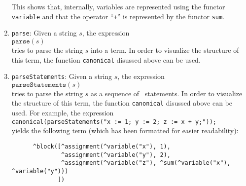 \begin{enumerate}
      This shows that, internally, variables are represented using the functor
      \texttt{variable} and that the operator ``\texttt{+}'' is represented by
      the functor \texttt{sum}.
\item \texttt{parse}:  Given a string $s$, the expression
      \\[0.2cm]
      \hspace*{1.3cm}
      $\mathtt{parse}(s)$ 
      \\[0.2cm]
      tries to parse the string $s$ into a term.  In order to visualize the structure of
      this term,  the function \texttt{canonical} disussed above can be used.      
\item \texttt{parseStatements}:  Given a string $s$, the expression
      \\[0.2cm]
      \hspace*{1.3cm}
      $\mathtt{parseStatements}(s)$ 
      \\[0.2cm]
      tries to parse the string $s$ as a sequence of \setlx\ statements.   In order to visualize the structure of
      this term,  the function \texttt{canonical} disussed above can be used.  For
      example, the expression
      \\[0.2cm]
      \hspace*{1.3cm}
      \texttt{canonical(parseStatements("x := 1; y := 2; z := x + y;"));}
      \\[0.2cm]
      yields the following term (which has been formatted for easier readability):
\begin{verbatim}
      ^block([^assignment(^variable("x"), 1), 
              ^assignment(^variable("y"), 2), 
              ^assignment(^variable("z"), ^sum(^variable("x"), ^variable("y")))
             ])
\end{verbatim}
\end{enumerate}

